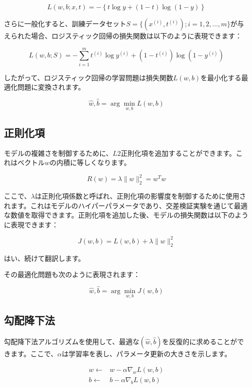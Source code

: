 \begin{content}
\[L(w,b;x,t) =  - \left\{ {t\log y + \left( {1 - t} \right)\log \left( {1 - y} \right)} \right\}\]

さらに一般化すると、訓練データセット$ S = \{ ({x^{(i)}},{t^{(i)}});i = 1,2,...,m\} $が与えられた場合、ロジスティック回帰の損失関数は以下のように表現できます：

\[L(w,b; S) =  - \sum\limits_{i = 1}^m {{t^{(i)}}\log {y^{(i)}} + \left( {1 - {t^{(i)}}} \right)\log \left( {1 - {y^{(i)}}} \right)} \]

したがって、ロジスティック回帰の学習問題は損失関数$L(w,b)$を最小化する最適化問題に変換されます。

\[\hat w,\hat b = \arg \mathop {\min }\limits_{w,b} L(w, b)\]

\subsection{正則化項}

モデルの複雑さを制御するために、$L2$正則化項を追加することができます。これはベクトル$w$の内積に等しくなります。

\[R(w) = \lambda \parallel w\parallel _2^2 = {w^T}w \]

ここで、$\lambda$は正則化項係数と呼ばれ、正則化項の影響度を制御するために使用されます。これはモデルのハイパーパラメータであり、交差検証実験を通じて最適な数値を取得できます。正則化項を追加した後、モデルの損失関数は以下のように表現できます：

\[J(w,b) = L(w,b) + \lambda \parallel w\parallel _2^2\]

はい、続けて翻訳します。

\]

その最適化問題も次のように表現されます：

\[\hat w,\hat b = \arg \mathop {\min }\limits_{w,b} J(w, b)\]

\subsection{勾配降下法}

勾配降下法アルゴリズムを使用して、最適な$(\hat w,\hat b)$を反復的に求めることができます。ここで、$\alpha$は学習率を表し、パラメータ更新の大きさを示します。

\[\begin{aligned}
  w \leftarrow & w - \alpha {\nabla _w}L(w,b) \\ 
  b \leftarrow & b - \alpha {\nabla _b}L(w,b) \\ 
\end{aligned} \]


\end{content}
